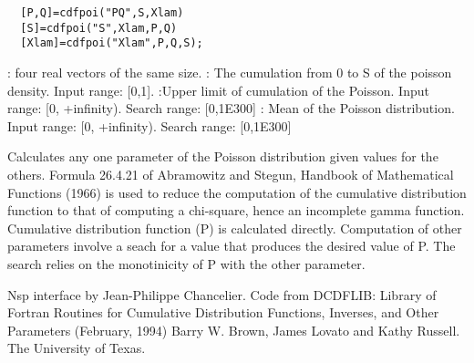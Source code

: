 \begin{mandesc}
\end{mandesc}
\label{cdfpoi}
\begin{calling_sequence}
\begin{verbatim}
  [P,Q]=cdfpoi("PQ",S,Xlam)  
  [S]=cdfpoi("S",Xlam,P,Q)  
  [Xlam]=cdfpoi("Xlam",P,Q,S);  
\end{verbatim}
\end{calling_sequence}
\begin{parameters}
  \begin{varlist}
     : four real vectors of the same size.
     :  The cumulation from 0 to S of the poisson density. Input range: [0,1].
     :Upper limit of cumulation of the Poisson. Input range: [0, +infinity). Search range: [0,1E300]
       :  Mean of the Poisson distribution. Input range: [0, +infinity). Search range: [0,1E300]
  \end{varlist}
\end{parameters}
\begin{mandescription}
  Calculates any one parameter of the Poisson
  distribution given values for the others.
  Formula   26.4.21  of   Abramowitz  and   Stegun,   Handbook  of
  Mathematical Functions (1966) is used  to reduce the computation
  of  the cumulative distribution function to that  of computing a
  chi-square, hence an incomplete gamma function.
  Cumulative  distribution function  (P) is  calculated  directly.
  Computation of other parameters involve a seach for a value that
  produces  the desired value of  P.   The  search relies  on  the
  monotinicity of P with the other parameter.
\end{mandescription}

\begin{authors}
  Nsp interface by Jean-Philippe Chancelier. Code from DCDFLIB: 
  Library of Fortran Routines for Cumulative Distribution
  Functions, Inverses, and Other Parameters (February, 1994)
  Barry W. Brown, James Lovato and Kathy Russell. The University of Texas.
\end{authors}
